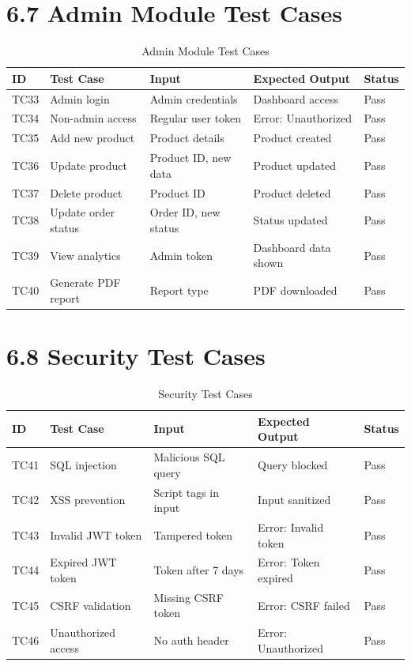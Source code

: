 \documentclass[12pt,a4paper]{report}
\begin{document}
\section*{6.7 Admin Module Test Cases}

\begin{table}[H]
\centering
\small
\begin{tabular}{|p{0.8cm}|p{2.8cm}|p{3.8cm}|p{3cm}|p{1.2cm}|}
\hline
\textbf{ID} & \textbf{Test Case} & \textbf{Input} & \textbf{Expected Output} & \textbf{Status} \\
\hline
TC33 & Admin login & Admin credentials & Dashboard access & Pass \\
\hline
TC34 & Non-admin access & Regular user token & Error: Unauthorized & Pass \\
\hline
TC35 & Add new product & Product details & Product created & Pass \\
\hline
TC36 & Update product & Product ID, new data & Product updated & Pass \\
\hline
TC37 & Delete product & Product ID & Product deleted & Pass \\
\hline
TC38 & Update order status & Order ID, new status & Status updated & Pass \\
\hline
TC39 & View analytics & Admin token & Dashboard data shown & Pass \\
\hline
TC40 & Generate PDF report & Report type & PDF downloaded & Pass \\
\hline
\end{tabular}
\caption{Admin Module Test Cases}
\end{table}

\section*{6.8 Security Test Cases}

\begin{table}[H]
\centering
\small
\begin{tabular}{|p{0.8cm}|p{2.8cm}|p{3.8cm}|p{3cm}|p{1.2cm}|}
\hline
\textbf{ID} & \textbf{Test Case} & \textbf{Input} & \textbf{Expected Output} & \textbf{Status} \\
\hline
TC41 & SQL injection & Malicious SQL query & Query blocked & Pass \\
\hline
TC42 & XSS prevention & Script tags in input & Input sanitized & Pass \\
\hline
TC43 & Invalid JWT token & Tampered token & Error: Invalid token & Pass \\
\hline
TC44 & Expired JWT token & Token after 7 days & Error: Token expired & Pass \\
\hline
TC45 & CSRF validation & Missing CSRF token & Error: CSRF failed & Pass \\
\hline
TC46 & Unauthorized access & No auth header & Error: Unauthorized & Pass \\
\hline
\end{tabular}
\caption{Security Test Cases}
\end{table}
\end{document}
